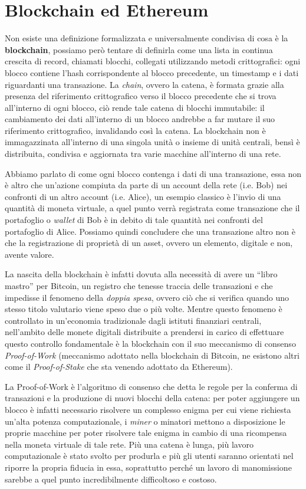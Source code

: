 \section{Blockchain ed Ethereum}
\label{sub:bc}
Non esiste una definizione formalizzata e universalmente condivisa di cosa è la
\textbf{blockchain}, possiamo però tentare di definirla come una lista in continua 
crescita di record, chiamati blocchi, collegati utilizzando metodi crittografici: 
ogni blocco contiene l’hash corrispondente al blocco precedente, un timestamp e i 
dati riguardanti una transazione. 
La \emph{chain}, ovvero la catena, è formata grazie alla presenza del riferimento 
crittografico verso il blocco precedente che si trova all’interno di ogni blocco, 
ciò rende tale catena di blocchi immutabile: il cambiamento dei dati all’interno di 
un blocco andrebbe a far mutare il suo riferimento crittografico, invalidando così la catena.
La blockchain non è immagazzinata all’interno di una singola unità o insieme di 
unità centrali, bensì è distribuita, condivisa e aggiornata tra varie macchine 
all’interno di una rete.

Abbiamo parlato di come ogni blocco contenga i dati di una transazione, essa non è 
altro che un’azione compiuta da parte di un account della rete (i.e. Bob) nei confronti 
di un altro account (i.e. Alice), un esempio classico è l’invio di una quantità di moneta 
virtuale, a quel punto verrà registrata come transazione che il portafoglio o \emph{wallet}
di Bob è in debito di tale quantità nei confronti del portafoglio di Alice.
Possiamo quindi concludere che una transazione altro non è che la registrazione di proprietà 
di un asset, ovvero un elemento, digitale e non, avente valore.

La nascita della blockchain è infatti dovuta alla necessità di avere un “libro mastro” per 
Bitcoin, un registro che tenesse traccia delle transazioni e che impedisse il fenomeno della 
\emph{doppia spesa}, ovvero ciò che si verifica quando uno stesso titolo valutario viene speso 
due o più volte. Mentre questo fenomeno è controllato in un’economia tradizionale dagli 
istituti finanziari centrali, nell’ambito delle monete digitali distribuite a prendersi 
in carico di effettuare questo controllo fondamentale è la blockchain con il suo 
meccanismo di consenso \emph{Proof-of-Work} 
(meccanismo adottato nella blockchain di Bitcoin, 
ne esistono altri come il \emph{Proof-of-Stake} che sta venendo adottato da Ethereum).

La Proof-of-Work è l’algoritmo di consenso che detta le regole per 
la conferma di transazioni e la produzione di nuovi blocchi della catena: 
per poter aggiungere un blocco è infatti necessario risolvere un complesso 
enigma per cui viene richiesta un’alta potenza computazionale, i \emph{miner} 
o minatori mettono a disposizione le proprie macchine per poter risolvere tale 
enigma in cambio di una ricompensa nella moneta virtuale di tale rete.
Più una catena è lunga, più lavoro computazionale è stato svolto per produrla e 
più gli utenti saranno orientati nel riporre la propria fiducia in essa, soprattutto 
perché un lavoro di manomissione sarebbe a quel punto incredibilmente difficoltoso e costoso.

